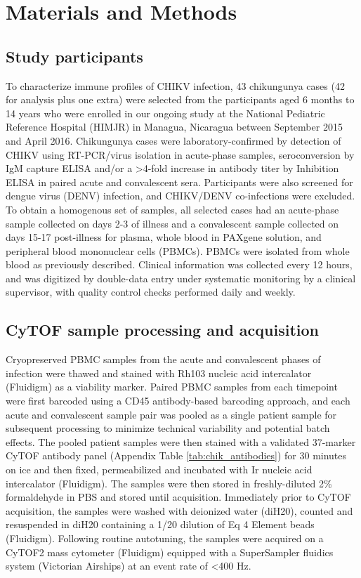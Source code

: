 \section{Materials and Methods}

\subsection{Study participants}

To characterize immune profiles of CHIKV infection, 43 chikungunya cases (42 for analysis plus one extra) were selected from the participants aged 6 months to 14 years who were enrolled in our ongoing study at the National Pediatric Reference Hospital (HIMJR) in Managua, Nicaragua between September 2015 and April 2016. Chikungunya cases were laboratory-confirmed by detection of CHIKV using RT-PCR/virus isolation in acute-phase samples, seroconversion by IgM capture ELISA and/or a >4-fold increase in antibody titer by Inhibition ELISA in paired acute and convalescent sera.\autocite{Galo2017} Participants were also screened for dengue virus (DENV) infection, and CHIKV/DENV co-infections were excluded. To obtain a homogenous set of samples, all selected cases had an acute-phase sample collected on days 2-3 of illness and a convalescent sample collected on days 15-17 post-illness for plasma, whole blood in PAXgene solution, and peripheral blood mononuclear cells (PBMCs). PBMCs were isolated from whole blood as previously described.\autocite{Zompi2012} Clinical information was collected every 12 hours, and was digitized by double-data entry under systematic monitoring by a clinical supervisor, with quality control checks performed daily and weekly. 

\subsection{CyTOF sample processing and acquisition}

Cryopreserved PBMC samples from the acute and convalescent phases of infection were thawed and stained with Rh103 nucleic acid intercalator (Fluidigm) as a viability marker. Paired PBMC samples from each timepoint were first barcoded using a CD45 antibody-based barcoding approach,\autocite{Mei2016} and each acute and convalescent sample pair was pooled as a single patient sample for subsequent processing to minimize technical variability and potential batch effects. The pooled patient samples were then stained with a validated 37-marker CyTOF antibody panel (Appendix Table \ref{tab:chik_antibodies}) for 30 minutes on ice and then fixed, permeabilized and incubated with Ir nucleic acid intercalator (Fluidigm). The samples were then stored in freshly-diluted 2\% formaldehyde in PBS and stored until acquisition. Immediately prior to CyTOF acquisition, the samples were washed with deionized water (diH20), counted and resuspended in diH20 containing a 1/20 dilution of Eq 4 Element beads (Fluidigm). Following routine autotuning, the samples were acquired on a CyTOF2 mass cytometer (Fluidigm) equipped with a SuperSampler fluidics system (Victorian Airships) at an event rate of <400 Hz. 

